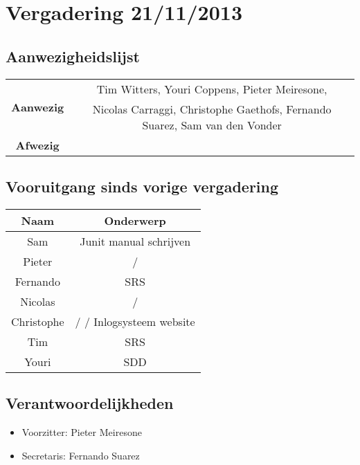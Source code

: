 \section{Vergadering 21/11/2013}
\subsection{Aanwezigheidslijst}
\begin{table}[htbp]
	\centering
	\begin{tabular}{c|c}
		\multirow{2}{*}{\textbf{Aanwezig}} & Tim Witters, Youri Coppens, Pieter Meiresone, \\
		& Nicolas Carraggi,  Christophe Gaethofs, Fernando Suarez, Sam van den Vonder \\
		\hline
		\textbf{Afwezig} & \\
	\end{tabular}
\end{table}

\subsection{Vooruitgang sinds vorige vergadering}
	\begin{table}[htbp]
	\begin{tabular}{c|c}
		\textbf{Naam} & \textbf{Onderwerp} \\ \hline
		Sam & Junit manual schrijven \\
		Pieter & / \\
		Fernando & SRS \\
		Nicolas & / \\
		Christophe & / / Inlogsysteem website \\
		Tim & SRS \\
		Youri & SDD \\
	\end{tabular}
	\end{table}

\subsection{Verantwoordelijkheden}
\begin{itemize}
	\item Voorzitter: Pieter Meiresone
	\item Secretaris: Fernando Suarez
\end{itemize}
